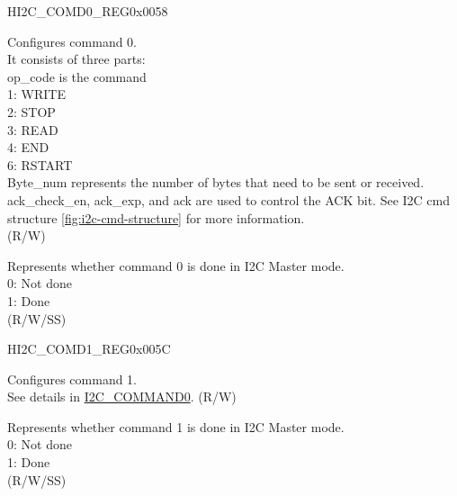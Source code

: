     \begin{register}{H}{I2C\_COMD0\_REG}{0x0058}\label{regdesc:I2CCOMD0REG}
    \regnewline%
    \begin{regdesc}\begin{reglist}
    \label{fielddesc:I2CCOMMAND0}\item [I2C\_COMMAND0] Configures command 0. \\
    It consists of three parts:\\
    op\_code is the command\\
    1: WRITE\\
    2: STOP\\
    3: READ\\
    4: END\\
    6: RSTART\\
    Byte\_num represents the number of bytes that need to be sent or received.\\
    ack\_check\_en, ack\_exp, and ack are used to control the ACK bit. See I2C cmd structure \ref{fig:i2c-cmd-structure} for more information. \\(R/W)
    \label{fielddesc:I2CCOMMAND0DONE}\item [I2C\_COMMAND0\_DONE] Represents whether command 0 is done in I2C Master mode.\\
    0: Not done \\
    1: Done \\ (R/W/SS)
    \end{reglist}\end{regdesc}
    \end{register}


    \begin{register}{H}{I2C\_COMD1\_REG}{0x005C}\label{regdesc:I2CCOMD1REG}
    \regnewline%
    \begin{regdesc}\begin{reglist}
    \label{fielddesc:I2CCOMMAND1}\item [I2C\_COMMAND1] Configures command 1.\\
    See details in \hyperref[fielddesc:I2CCOMMAND0]{I2C\_COMMAND0}. (R/W)
    \label{fielddesc:I2CCOMMAND1DONE}\item [I2C\_COMMAND1\_DONE] Represents whether command 1 is done in I2C Master mode.\\
    0: Not done \\
    1: Done \\ (R/W/SS)
    \end{reglist}\end{regdesc}
    \end{register}


